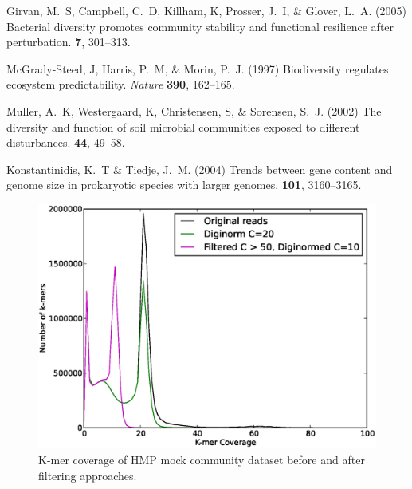 \documentclass{pnastwo}
\begin{document}
\begin{article}
\begin{thebibliography}{10}
 Girvan, M.~S, Campbell, C.~D, Killham, K, Prosser, J.~I,
\& Glover, L.~A. \newblock (2005) {Bacterial diversity promotes community
stability and functional resilience after perturbation.}  {\bf 7}, 301--313.

 McGrady-Steed, J, Harris, P.~M, \& Morin, P.~J.
\newblock (1997) {Biodiversity regulates ecosystem predictability}. \newblock
{\em Nature} {\bf 390}, 162--165.

 Muller, A.~K, Westergaard, K, Christensen, S, \&
Sorensen, S.~J. \newblock (2002) {The diversity and function of soil microbial
communities exposed to different disturbances.}  {\bf 44}, 49--58.

 Konstantinidis, K.~T \& Tiedje, J.~M. \newblock
(2004) {Trends between gene content and genome size in prokaryotic species with
larger genomes}.  {\bf 101}, 3160--3165.

\end{thebibliography} \end{article}

\begin{figure} \begin{center}
\centerline{\includegraphics[width=.7\textwidth]{./figures/fig1-hmpassemblyhist.eps}}
\caption{K-mer coverage of HMP mock community dataset before and after filtering
approaches.} \label{kmercoverage} \end{center} \end{figure}
\end{document}
